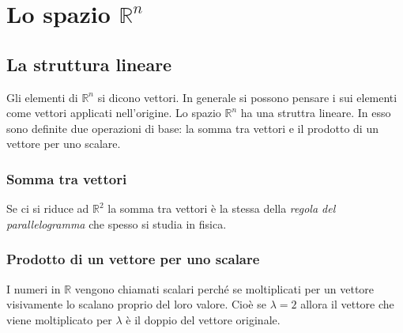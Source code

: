 \section{Lo spazio $\mathbb{R}^n$}
\subsection{La struttura lineare}
Gli elementi di $\mathbb{R}^n$ si dicono vettori. In generale si possono 
pensare i sui elementi come vettori applicati nell'origine. Lo spazio 
$\mathbb{R}^n$ ha una struttra lineare. In esso sono definite due operazioni 
di base: la somma tra vettori e il prodotto di un vettore per uno scalare.

\subsubsection{Somma tra vettori}

Se ci si riduce ad $\mathbb{R}^2$ la somma tra vettori è la stessa della 
\textit{regola del parallelogramma} che spesso si studia in fisica.

\subsubsection{Prodotto di un vettore per uno scalare}
I numeri in $\mathbb{R}$ vengono chiamati scalari perché se moltiplicati per un 
vettore visivamente lo scalano proprio del loro valore. Cioè se $\lambda = 2$ 
allora il vettore che viene moltiplicato per $\lambda$ è il doppio del vettore 
originale.

